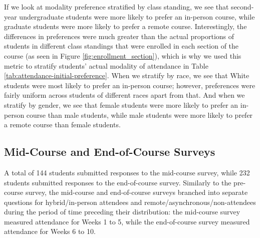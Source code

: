 If we look at modality preference stratified by class standing, we see that second-year undergraduate students were more likely to prefer an in-person course, while graduate students were more likely to prefer a remote course. Interestingly, the differences in preferences were much greater than the actual proportions of students in different class standings that were enrolled in each section of the course (as seen in Figure \ref{fig:enrollment_section}), which is why we used this metric to stratify students' actual modality of attendance in Table \ref{tab:attendance-initial-preference}. When we stratify by race, we see that White students were most likely to prefer an in-person course; however, preferences were fairly uniform across students of different races apart from that. And when we stratify by gender, we see that female students were more likely to prefer an in-person course than male students, while male students were more likely to prefer a remote course than female students.

\subsection{Mid-Course and End-of-Course Surveys}

A total of 144 students submitted responses to the mid-course survey, while 232 students submitted responses to the end-of-course survey. Similarly to the pre-course survey, the mid-course and end-of-course surveys branched into separate questions for hybrid/in-person attendees and remote/asynchronous/non-attendees during the period of time preceding their distribution: the mid-course survey measured attendance for Weeks 1 to 5, while the end-of-course survey measured attendance for Weeks 6 to 10.

